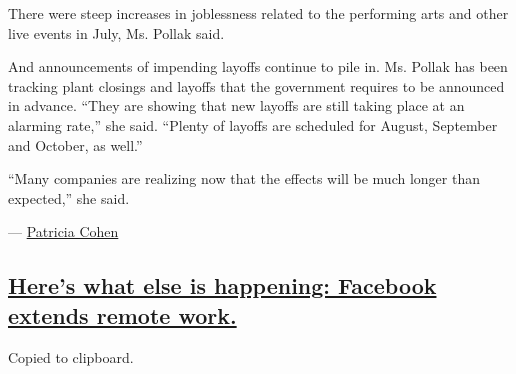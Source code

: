 There were steep increases in joblessness related to the performing arts
and other live events in July, Ms. Pollak said.

And announcements of impending layoffs continue to pile in. Ms. Pollak
has been tracking plant closings and layoffs that the government
requires to be announced in advance. ``They are showing that new layoffs
are still taking place at an alarming rate,'' she said. ``Plenty of
layoffs are scheduled for August, September and October, as well.''

``Many companies are realizing now that the effects will be much longer
than expected,'' she said.

--- \href{https://www.nytimes3xbfgragh.onion/by/patricia-cohen}{Patricia
Cohen}

\hypertarget{heres-what-else-is-happening-facebook-extends-remote-work}{%
\subsection{\texorpdfstring{\protect\hyperlink{heres-what-else-is-happening-facebook-extends-remote-work}{Here's
what else is happening: Facebook extends remote
work.}}{Here's what else is happening: Facebook extends remote work.}}\label{heres-what-else-is-happening-facebook-extends-remote-work}}

Copied to clipboard.

